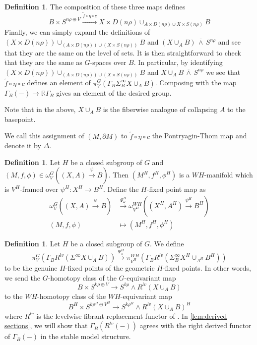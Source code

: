 \documentclass[11pt]{amsart}
\newcommand{\R}{\mathbb R}
\newcommand{\barsmash}{\,\overline\wedge\,}
\theoremstyle{plain}   %
\theoremstyle{definition}
\newtheorem{df}[thm]{Definition}
\theoremstyle{remark}
\numberwithin{equation}{section}
\begin{document}
\begin{df}
The composition of these three maps defines
\[
B\times S^{n\rho\oplus V} \xrightarrow{\tilde{f}\circ \eta\circ c} X\times D(n\rho)\cup_{A\times D(n\rho)\cup X\times S(n\rho)}B
\]
Finally, we can simply expand the definitions of $(X\times D(n\rho))\cup_{(A\times D(n\rho))\cup (X\times S(n\rho))}B$ and $(X\cup_A B) \barsmash S^{n\rho}$ and see that they are the same on the level of sets. It is then straightforward to check that they are the same as $G$-spaces over $B$. In particular, by identifying $(X\times D(n\rho))\cup_{(A\times D(n\rho))\cup (X\times S(n\rho))}B$ and $X\cup_A B \barsmash S^{n\rho}$ we see that $\tilde{f}\circ \eta\circ c$ defines an element of $\pi_V^G(\Gamma_B\Sigma_B^\infty X\cup_A B)$. Composing with the map $\Gamma_B(-)\to \R\Gamma_B$ gives an element of the desired group.

Note that in the above, $X\cup_A B$ is the fiberwise analogue of collapsing $A$ to the basepoint. 

We call this assignment of $(M,\partial M)$ to $\tilde{f}\circ \eta\circ c$ the Pontryagin-Thom map and denote it by $\Delta$. 
\end{df}

\begin{df}
Let $H$ be a closed subgroup of $G$ and $(M,f,\phi)\in \omega_V^G((X,A)\xrightarrow{\psi}B)$. Then $(M^H,f^H,\phi^H)$ is a $WH$-manifold which is $V^H$-framed over $\psi^H:X^H\to B^H$. Define the $H$-fixed point map as 
\begin{align*}
\omega_V^G((X,A)\xrightarrow{\psi}B)&\xrightarrow{\Psi_\omega^H} \omega_{V^H}^{WH}((X^H,A^H)\xrightarrow{\psi^H}B^H)\\
(M,f,\phi)& \mapsto (M^H,f^H,\phi^H)
\end{align*}
\end{df}

\begin{df}
Let $H$ be a closed subgroup of $G$. We define
\[
\pi_V^G \left(\Gamma_BR^{lv}( \Sigma^\infty X\cup_A B) \right) \xrightarrow{\Psi_\pi^H} \pi_{V^H}^{WH}\left( \Gamma_BR^{lv}(\Sigma_B^\infty X^H\cup_{A^H} B^H) \right)
\]
to be the genuine $H$-fixed points of the geometric $H$-fixed points. In other words, we send the $G$-homotopy class of the $G$-equivariant map 
\[
B\times S^{k\rho\oplus V}\rightarrow S^{k\rho}\wedge R^{lv}(X\cup_A B)
\]
to the $WH$-homotopy class of the $WH$-equivariant map 
\[
B^H\times S^{k\rho^H\oplus V^H}\rightarrow S^{k\rho^H}\wedge R^{lv}(X\cup_{A} B)^H
\]
where $R^{lv}$ is the levelwise fibrant replacement functor of \cite{malkiewich_convenient}. In \cref{lem:derived sections}, we will show that $\Gamma_B(R^{lv}(-))$ agrees with the right derived functor of $\Gamma_B(-)$ in the stable model structure. 
\end{df}
\end{document}
